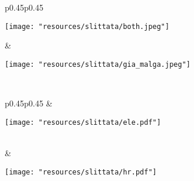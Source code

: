 \documentclass{article}
\begin{document}
\vspace*{1cm}

\begin{table}[h]
    \centering
    \begin{tabular}{p{0.45\textwidth}p{0.45\textwidth}}
        \begin{minipage}{\linewidth}
            \centering
            \texttt{[image: "resources/slittata/both.jpeg"]}
        \end{minipage} &
        \begin{minipage}{\linewidth}
            \centering
            \texttt{[image: "resources/slittata/gia\_malga.jpeg"]}
        \end{minipage} \\
    \end{tabular}
\end{table}

\newpage

\begin{table}[h]
    \centering
    \begin{tabular}{p{0.45\textwidth}p{0.45\textwidth}}
         &
        \begin{minipage}{\linewidth}
            \centering
            \texttt{[image: "resources/slittata/ele.pdf"]}
        \end{minipage} \\
        & 
        \begin{minipage}{\linewidth}
            \centering
            \texttt{[image: "resources/slittata/hr.pdf"]}
        \end{minipage} \\
    \end{tabular}
\end{table}
\end{document}
